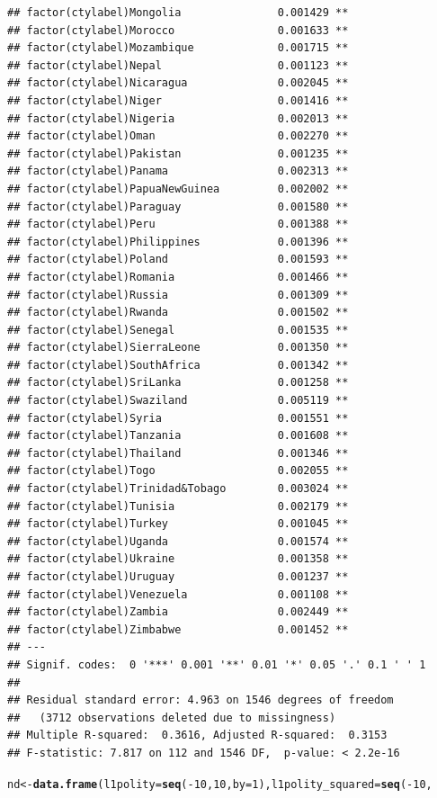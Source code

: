 \documentclass[12pt]{article}\usepackage[]{graphicx}\usepackage[]{color}
\makeatletter
\newcommand{\hlnum}[1]{\textcolor[rgb]{0.686,0.059,0.569}{#1}}%
\newcommand{\hlopt}[1]{\textcolor[rgb]{0,0,0}{#1}}%
\newcommand{\hlstd}[1]{\textcolor[rgb]{0.345,0.345,0.345}{#1}}%
\newcommand{\hlkwb}[1]{\textcolor[rgb]{0.69,0.353,0.396}{#1}}%
\newcommand{\hlkwc}[1]{\textcolor[rgb]{0.333,0.667,0.333}{#1}}%
\newcommand{\hlkwd}[1]{\textcolor[rgb]{0.737,0.353,0.396}{\textbf{#1}}}%
\newenvironment{kframe}{%
 \def\at@end@of@kframe{}%
 \ifinner\ifhmode%
  \def\at@end@of@kframe{\end{minipage}}%
  \begin{minipage}{\columnwidth}%
 \fi\fi%
 \def\FrameCommand##1{\hskip\@totalleftmargin \hskip-\fboxsep
 \colorbox{shadecolor}{##1}\hskip-\fboxsep
     \hskip-\linewidth \hskip-\@totalleftmargin \hskip\columnwidth}%
 \MakeFramed {\advance\hsize-\width
   \@totalleftmargin\z@ \linewidth\hsize
   \@setminipage}}%
 {\par\unskip\endMakeFramed%
 \at@end@of@kframe}
\newenvironment{knitrout}{}{} %
\makeatother
\begin{document}
\begin{knitrout}
\begin{kframe}
\begin{verbatim}
## factor(ctylabel)Mongolia               0.001429 ** 
## factor(ctylabel)Morocco                0.001633 ** 
## factor(ctylabel)Mozambique             0.001715 ** 
## factor(ctylabel)Nepal                  0.001123 ** 
## factor(ctylabel)Nicaragua              0.002045 ** 
## factor(ctylabel)Niger                  0.001416 ** 
## factor(ctylabel)Nigeria                0.002013 ** 
## factor(ctylabel)Oman                   0.002270 ** 
## factor(ctylabel)Pakistan               0.001235 ** 
## factor(ctylabel)Panama                 0.002313 ** 
## factor(ctylabel)PapuaNewGuinea         0.002002 ** 
## factor(ctylabel)Paraguay               0.001580 ** 
## factor(ctylabel)Peru                   0.001388 ** 
## factor(ctylabel)Philippines            0.001396 ** 
## factor(ctylabel)Poland                 0.001593 ** 
## factor(ctylabel)Romania                0.001466 ** 
## factor(ctylabel)Russia                 0.001309 ** 
## factor(ctylabel)Rwanda                 0.001502 ** 
## factor(ctylabel)Senegal                0.001535 ** 
## factor(ctylabel)SierraLeone            0.001350 ** 
## factor(ctylabel)SouthAfrica            0.001342 ** 
## factor(ctylabel)SriLanka               0.001258 ** 
## factor(ctylabel)Swaziland              0.005119 ** 
## factor(ctylabel)Syria                  0.001551 ** 
## factor(ctylabel)Tanzania               0.001608 ** 
## factor(ctylabel)Thailand               0.001346 ** 
## factor(ctylabel)Togo                   0.002055 ** 
## factor(ctylabel)Trinidad&Tobago        0.003024 ** 
## factor(ctylabel)Tunisia                0.002179 ** 
## factor(ctylabel)Turkey                 0.001045 ** 
## factor(ctylabel)Uganda                 0.001574 ** 
## factor(ctylabel)Ukraine                0.001358 ** 
## factor(ctylabel)Uruguay                0.001237 ** 
## factor(ctylabel)Venezuela              0.001108 ** 
## factor(ctylabel)Zambia                 0.002449 ** 
## factor(ctylabel)Zimbabwe               0.001452 ** 
## ---
## Signif. codes:  0 '***' 0.001 '**' 0.01 '*' 0.05 '.' 0.1 ' ' 1
## 
## Residual standard error: 4.963 on 1546 degrees of freedom
##   (3712 observations deleted due to missingness)
## Multiple R-squared:  0.3616,	Adjusted R-squared:  0.3153 
## F-statistic: 7.817 on 112 and 1546 DF,  p-value: < 2.2e-16
\end{verbatim}
\begin{alltt}
\hlstd{nd} \hlkwb{<-} \hlkwd{data.frame}\hlstd{(}\hlkwc{l1polity} \hlstd{=} \hlkwd{seq}\hlstd{(}\hlopt{-}\hlnum{10}\hlstd{,} \hlnum{10}\hlstd{,} \hlkwc{by} \hlstd{=} \hlnum{1}\hlstd{),} \hlkwc{l1polity_squared} \hlstd{=} \hlkwd{seq}\hlstd{(}\hlopt{-}\hlnum{10}\hlstd{,}

\end{alltt}
\end{kframe}
\end{knitrout}
\end{document}
